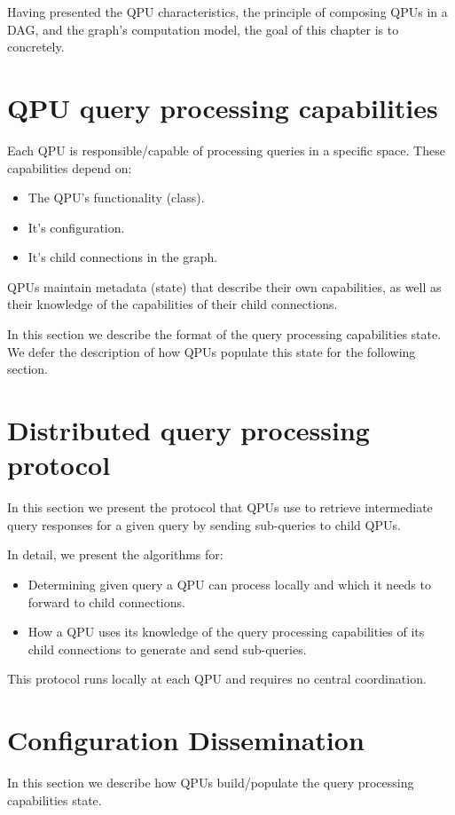 Having presented the QPU characteristics, the principle of composing QPUs in a DAG, and the graph's computation model,
the goal of this chapter is to concretely.

\section{QPU query processing capabilities}

Each QPU is responsible/capable of processing queries in a specific space. These capabilities depend on:
\begin{itemize}
  \item The QPU's functionality (class).
  \item It's configuration.
  \item It's child connections in the graph.
\end{itemize}

QPUs maintain metadata (state) that describe their own capabilities, as well as their knowledge of the capabilities of
their child connections.

In this section we describe the format of the query processing capabilities state. We defer the description of how QPUs
populate this state for the following section.

\section{Distributed query processing protocol}
In this section we present the protocol that QPUs use to retrieve intermediate query responses for a given query by
sending sub-queries to child QPUs.

In detail, we present the algorithms for:
\begin{itemize}
  \item Determining given query a QPU can process locally and which it needs to forward to child connections.
  \item How a QPU uses its knowledge of the query processing capabilities of its child connections to generate and send
  sub-queries.
\end{itemize}

This protocol runs locally at each QPU and requires no central coordination.

\section{Configuration Dissemination}
In this section we describe how QPUs build/populate the query processing capabilities state.


